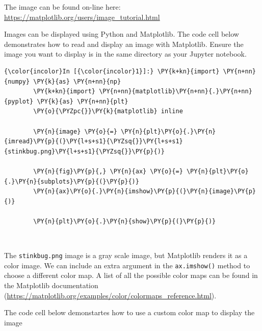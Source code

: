 \documentclass[11pt]{article}
\begin{document}
The image can be found on-line here:
\url{https://matplotlib.org/users/image_tutorial.html}

Images can be displayed using Python and Matplotlib. The code cell below
demonstrates how to read and display an image with Matplotlib. Ensure
the image you want to display is in the same directory as your Jupyter
notebook.

    \begin{Verbatim}[commandchars=\\\{\}]
{\color{incolor}In [{\color{incolor}1}]:} \PY{k+kn}{import} \PY{n+nn}{numpy} \PY{k}{as} \PY{n+nn}{np}
        \PY{k+kn}{import} \PY{n+nn}{matplotlib}\PY{n+nn}{.}\PY{n+nn}{pyplot} \PY{k}{as} \PY{n+nn}{plt}
        \PY{o}{\PYZpc{}}\PY{k}{matplotlib} inline
        
        \PY{n}{image} \PY{o}{=} \PY{n}{plt}\PY{o}{.}\PY{n}{imread}\PY{p}{(}\PY{l+s+s1}{\PYZsq{}}\PY{l+s+s1}{stinkbug.png}\PY{l+s+s1}{\PYZsq{}}\PY{p}{)}
        
        \PY{n}{fig}\PY{p}{,} \PY{n}{ax} \PY{o}{=} \PY{n}{plt}\PY{o}{.}\PY{n}{subplots}\PY{p}{(}\PY{p}{)}
        \PY{n}{ax}\PY{o}{.}\PY{n}{imshow}\PY{p}{(}\PY{n}{image}\PY{p}{)}
        
        \PY{n}{plt}\PY{o}{.}\PY{n}{show}\PY{p}{(}\PY{p}{)}
\end{Verbatim}


    \begin{center}
    \end{center}
    { \hspace*{\fill} \\}
    
    The \texttt{stinkbug.png} image is a gray scale image, but Matplotlib
renders it as a color image. We can include an extra argument in the
\texttt{ax.imshow()} method to choose a different color map. A list of
all the possible color maps can be found in the Matplotlib documentation
(\url{https://matplotlib.org/examples/color/colormaps_reference.html}).

The code cell below demonstartes how to use a custom color map to
display the image
\end{document}
